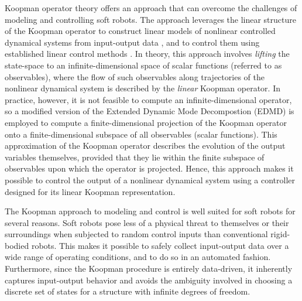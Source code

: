 Koopman operator theory offers an approach that can overcome the challenges of modeling and controlling soft robots.
The approach leverages the linear structure of the Koopman operator to construct linear models of nonlinear controlled dynamical systems from input-output data \cite{bruder2018nonlinear, mauroy2016linear}, and to control them using established linear control methods \cite{Abraham-RSS-17, korda2018linear}.
In theory, this approach involves \emph{lifting} the state-space to an infinite-dimensional space of scalar functions (referred to as observables), where the flow of such observables along trajectories of the nonlinear dynamical system is described by the \emph{linear} Koopman operator.
In practice, however, it is not feasible to compute an infinite-dimensional operator, so a modified version of the Extended Dynamic Mode Decompostion (EDMD) is employed to compute a finite-dimensional projection of the Koopman operator onto a finite-dimensional subspace of all observables (scalar functions).
This approximation of the Koopman operator describes the evolution of the output variables themselves, provided that they lie within the finite subspace of observables upon which the operator is projected.
Hence, this approach makes it possible to control the output of a nonlinear dynamical system using a controller designed for its linear Koopman representation.

The Koopman approach to modeling and control is well suited for soft robots for several reasons.
Soft robots pose less of a physical threat to themselves or their surroundings when subjected to random control inputs than conventional rigid-bodied robots. 
This makes it possible to safely collect input-output data over a wide range of operating conditions, and to do so in an automated fashion. 
Furthermore, since the Koopman procedure is entirely data-driven, it inherently captures input-output behavior and avoids the ambiguity involved in choosing a discrete set of states for a structure with infinite degrees of freedom.

